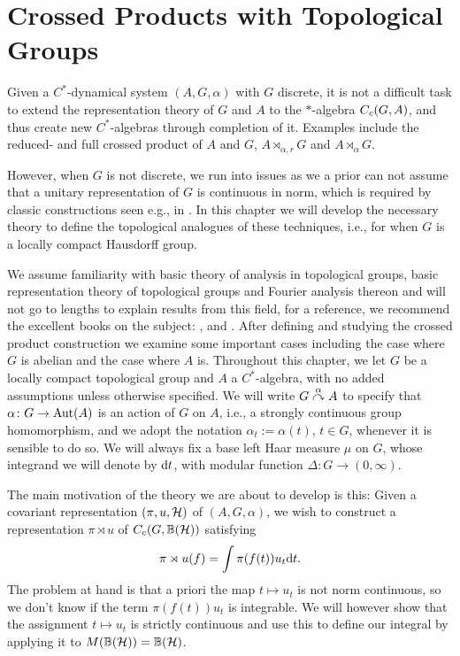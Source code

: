 \chapter{Crossed Products with Topological Groups}
Given a $C^*$-dynamical system $(A,G,\alpha)$ with $G$ discrete, it is not a difficult task to extend the representation theory of $G$ and $A$ to the $*$-algebra $C_c(G,A)$, and thus create new $C^*$-algebras through completion of it. Examples include the reduced- and full crossed product of $A$ and $G$, $A \rtimes_{\alpha,r} G$ and $A \rtimes_{\alpha} G$.

However, when $G$ is not discrete, we run into issues as we a prior can not assume that a unitary representation of $G$ is continuous in norm, which is required by classic constructions seen e.g., in \cite{brown2008c}. In this chapter we will develop the necessary theory to define the topological analogues of these techniques, i.e., for when $G$ is a locally compact Hausdorff group.

We assume familiarity with basic theory of analysis in topological groups, basic representation theory of topological groups and Fourier analysis thereon and will not go to lengths to explain results from this field, for a reference, we recommend the excellent books on the subject: \cite{folland2016fourier}, \cite{berg1984harmonic} and \cite{folland2013real}. After defining and studying the crossed product construction we examine some important cases including the case where $G$ is abelian and the case where $A$ is.
Throughout this chapter, we let $G$ be a locally compact topological group and $A$ a $C^*$-algebra, with no added assumptions unless otherwise specified. We will write $G \stackrel{\alpha}{\curvearrowright} A$ to specify that $\alpha \colon G \to \operatorname{Aut}(A)$ is an action of $G$ on $A$, i.e., a strongly continuous group homomorphism, and we adopt the notation $\alpha_t := \alpha(t)$, $t \in G$, whenever it is sensible to do so. We will always fix a base left Haar measure $\mu$ on $G$, whose integrand we will denote by $\mathrm{d} t$, with modular function $\Delta \colon G \to (0,\infty)$. 

The main motivation of the theory we are about to develop is this: Given a covariant representation $(\pi,u,\mathcal{H})$ of $(A,G,\alpha)$, we wish to construct a representation $\pi \rtimes u$ of $C_c(G,\mathbb{B}(\mathcal{H}))$ satisfying 
\begin{align*}
\pi \rtimes u (f) = \int \pi(f(t))u_t \mathrm{d} t.
\end{align*}
The problem at hand is that a priori the map $t \mapsto u_t$ is not norm continuous, so we don't know if the term $\pi(f(t))u_t$ is integrable. We will however show that the assignment $t \mapsto u_t$ is strictly continuous and use this to define our integral by applying it to $M(\mathbb{B}(\mathcal{H})) = \mathbb{B}(\mathcal{H})$. 

